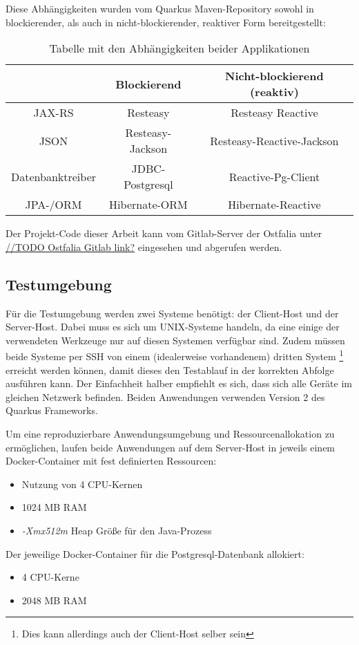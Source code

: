 Diese Abhängigkeiten wurden vom Quarkus Maven-Repository sowohl in blockierender,
als auch in nicht-blockierender, reaktiver Form bereitgestellt: \parencite{MavenQuarkusIO}
\setlength{\tabcolsep}{18pt}
\renewcommand{\arraystretch}{1.5}
\begin{table}[ht!]
    \centering
    \begin{tabular}{| c | c | c |}
        \hline
                         & Blockierend      & Nicht-blockierend (reaktiv) \\
        \hline
        JAX-RS           & Resteasy         & Resteasy Reactive           \\
        \hline
        JSON             & Resteasy-Jackson & Resteasy-Reactive-Jackson   \\
        \hline
        Datenbanktreiber & JDBC-Postgresql  & Reactive-Pg-Client          \\
        \hline
        JPA-/ORM         & Hibernate-ORM    & Hibernate-Reactive          \\
        \hline
    \end{tabular}
    \caption{Tabelle mit den Abhängigkeiten beider Applikationen}
    \label{table:dependencies}
\end{table}
Der Projekt-Code dieser Arbeit kann vom Gitlab-Server der Ostfalia unter
\url{//TODO Ostfalia Gitlab link?} eingesehen und abgerufen werden.
\subsection{Testumgebung}
\label{section:testumgebung}
Für die Testumgebung werden zwei Systeme benötigt: der Client-Host und der Server-Host.
Dabei muss es sich um UNIX-Systeme handeln, da eine einige der verwendeten Werkzeuge nur 
auf diesen Systemen verfügbar sind.
Zudem müssen beide Systeme per SSH von einem (idealerweise vorhandenem) dritten System 
\footnote{Dies kann allerdings auch der Client-Host selber sein} 
erreicht werden können, damit dieses den Testablauf in der korrekten Abfolge ausführen kann. 
Der Einfachheit halber empfiehlt es sich, dass sich alle Geräte im gleichen Netzwerk befinden.
Beiden Anwendungen verwenden Version 2 des Quarkus Frameworks. 

Um eine reproduzierbare Anwendungsumgebung und Ressourcenallokation zu ermöglichen, laufen beide Anwendungen auf dem Server-Host in
jeweils einem Docker-Container mit fest definierten Ressourcen:
\begin{itemize}
    \item Nutzung von 4 CPU-Kernen
    \item 1024 MB RAM
    \item \textit{-Xmx512m} Heap Größe für den Java-Prozess
\end{itemize}
Der jeweilige Docker-Container für die Postgresql-Datenbank allokiert:
\begin{itemize}
    \item 4 CPU-Kerne
    \item 2048 MB RAM
\end{itemize}

